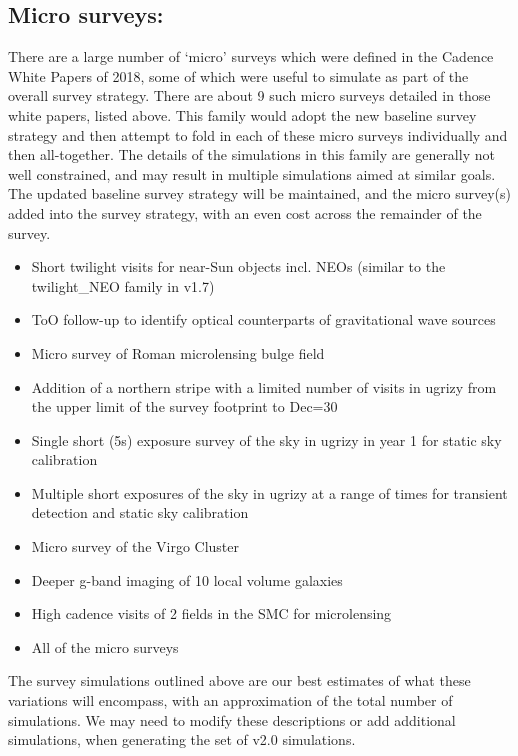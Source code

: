 \subsection{Micro surveys: }
There are a large number of ‘micro’ surveys which were defined in the Cadence White Papers of 2018, some of which were useful to simulate as part of the overall survey strategy. There are about 9 such micro surveys detailed in those white papers, listed above. This family would adopt the new baseline survey strategy and then attempt to fold in each of these micro surveys individually and then all-together.  The details of the simulations in this family are generally not well constrained, and may result in multiple simulations aimed at similar goals. The updated baseline survey strategy will be maintained, and the micro survey(s) added into the survey strategy, with an even cost across the remainder of the survey. 
\begin{itemize}
\item Short twilight visits for near-Sun objects incl. NEOs (similar to the twilight\_NEO family in v1.7)
\item ToO follow-up to identify optical counterparts of gravitational wave sources 
\item Micro survey of Roman microlensing bulge field
\item Addition of a northern stripe with a limited number of visits in ugrizy from the upper limit of the survey footprint to Dec=30
\item Single short (5s) exposure survey of the sky in ugrizy in year 1 for static sky calibration
\item Multiple short exposures of the sky in ugrizy at a range of times for transient detection and static sky calibration 
\item Micro survey of the Virgo Cluster
\item Deeper g-band imaging of 10 local volume galaxies
\item High cadence visits of 2 fields in the SMC for microlensing
\item All of the micro surveys 
\end{itemize}


The survey simulations outlined above are our best estimates of what these variations will encompass, with an approximation of the total number of simulations. We may need to  modify these descriptions or add additional simulations, when generating the set of v2.0 simulations. 
 
 
\vskip 0.4in

